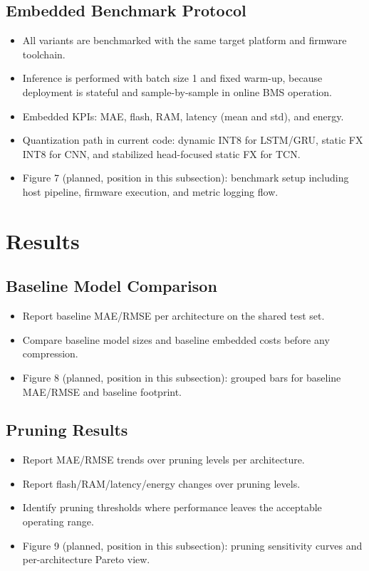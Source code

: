 ﻿\documentclass[review]{elsarticle}
\begin{document}
\subsection{Embedded Benchmark Protocol}
\begin{itemize}[leftmargin=*]
\item All variants are benchmarked with the same target platform and firmware toolchain.
\item Inference is performed with batch size 1 and fixed warm-up, because deployment is stateful and sample-by-sample in online BMS operation.
\item Embedded KPIs: MAE, flash, RAM, latency (mean and std), and energy.
\item Quantization path in current code: dynamic INT8 for LSTM/GRU, static FX INT8 for CNN, and stabilized head-focused static FX for TCN.
\item Figure 7 (planned, position in this subsection): benchmark setup including host pipeline, firmware execution, and metric logging flow.
\end{itemize}

\section{Results}
\subsection{Baseline Model Comparison}
\begin{itemize}[leftmargin=*]
\item Report baseline MAE/RMSE per architecture on the shared test set.
\item Compare baseline model sizes and baseline embedded costs before any compression.
\item Figure 8 (planned, position in this subsection): grouped bars for baseline MAE/RMSE and baseline footprint.
\end{itemize}

\subsection{Pruning Results}
\begin{itemize}[leftmargin=*]
\item Report MAE/RMSE trends over pruning levels per architecture.
\item Report flash/RAM/latency/energy changes over pruning levels.
\item Identify pruning thresholds where performance leaves the acceptable operating range.
\item Figure 9 (planned, position in this subsection): pruning sensitivity curves and per-architecture Pareto view.
\end{itemize}
\end{document}
